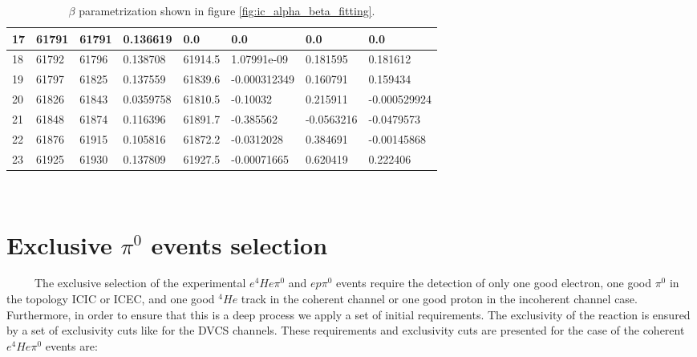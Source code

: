 \begin{itemize}
\begin {table}[!h]
\begin{center}
\begin{tabular}{|l|l|l|l|l|l|l|l|}
\hline
17 &    61791  &   61791    &  0.136619  &   0.0   &   0.0   &    0.0  &    0.0\\
\hline
18&   61792   &  61796 & 0.138708   &  61914.5   &   1.07991e-09     &  0.181595    &  0.181612\\
\hline
19 &  61797  &   61825  &    0.137559   &  61839.6 &     -0.000312349  &     0.160791&      0.159434\\
\hline
20  &61826   & 61843     & 0.0359758   &  61810.5   &   -0.10032      & 0.215911     & -0.000529924\\
\hline
21 & 61848  &  61874      &0.116396   &  61891.7   &   -0.385562     &  -0.0563216    &  -0.0479573\\
\hline
22&   61876  &   61915  &  0.105816  &   61872.2    &  -0.0312028     &  0.384691    &  -0.00145868\\
\hline
23 & 61925   &  61930    &  0.137809   &  61927.5    &  -0.00071665  &     0.620419   &   0.222406\\

\hline
\end{tabular}
\caption{$\beta$ parametrization shown in figure \ref{fig:ic_alpha_beta_fitting}.}
\label{Table:ic_beta_corrections}
\end{center}
\end{table}
\end{itemize}

~\newpage

\chapter{Exclusive $\pi^{0}$ events selection}\label{app:Exclusive_pi0_selection}

~~~~~The exclusive selection of the experimental $e^{4}He\pi^{0}$ and $ep\pi^{0}$ events require the detection of only one good electron, one good $\pi^{0}$ in the topology ICIC or ICEC, and one good $^{4}He$ track in the coherent channel or one good proton in the incoherent channel case. Furthermore, in order to ensure that this is a deep process we apply a set of initial requirements. The exclusivity of the reaction is ensured by a set of exclusivity cuts like for the DVCS channels. These requirements and exclusivity cuts are presented for the case of the coherent $e^{4}He\pi^{0}$ events are:


